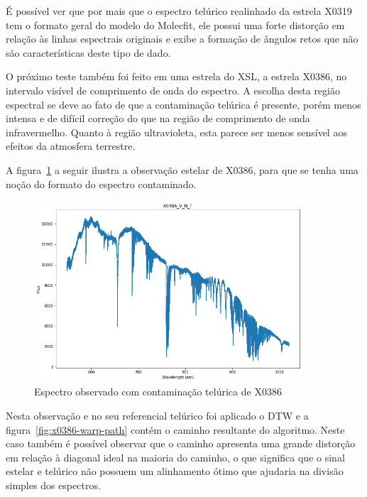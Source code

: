 É possível ver que por mais que o espectro telúrico realinhado da estrela X0319 tem o formato geral do modelo do Molecfit, ele possui uma forte distorção em relação às linhas espectrais originais e exibe a formação de ângulos retos que não são características deste tipo de dado.

O próximo teste também foi feito em uma estrela do XSL, a estrela X0386, no intervalo visível de comprimento de onda do espectro. A escolha desta região espectral se deve ao fato de que a contaminação telúrica é presente, porém menos intensa e de difícil correção do que na região de comprimento de onda infravermelho. Quanto à região ultravioleta, esta parece ser menos sensível aos efeitos da atmosfera terrestre. 

A figura~\ref{fig:x0386-v-n-e} a seguir ilustra a observação estelar de X0386, para que se tenha uma noção do formato do espectro contaminado.

\begin{figure}[htb]
\centering
\includegraphics[width=10cm]{figuras/x0386_v_n_e_spectrum.png}
\caption{Espectro observado com contaminação telúrica de X0386}
\label{fig:x0386-v-n-e}
\end{figure}

Nesta observação e no seu referencial telúrico foi aplicado o DTW e a figura~\ref{fig:x0386-warp-path} contém o caminho resultante do algoritmo. Neste caso também é possível observar que o caminho apresenta uma grande distorção em relação à diagonal ideal na maioria do caminho, o que significa que o sinal estelar e telúrico não possuem um alinhamento ótimo que ajudaria na divisão simples dos espectros.

